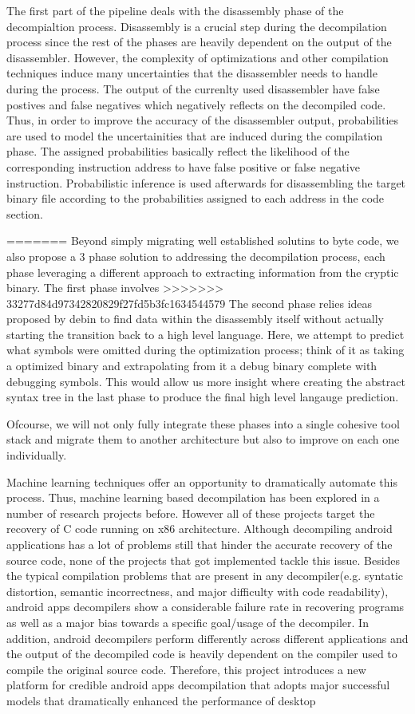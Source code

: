 \documentclass{article}
\begin{document}
The first part of the pipeline deals with the disassembly phase of the decompialtion process. Disassembly is a crucial step during the decompilation process since the rest of the phases are heavily dependent on the output of the disassembler. However, the complexity of optimizations and other compilation techniques induce many uncertainties that the disassembler needs to handle during the process. The output of the currenlty used disassembler have false postives and false negatives which negatively reflects on the decompiled code. Thus, in order to improve the accuracy of the disassembler output, probabilities are used to model the uncertainities that are induced during the compilation phase. The assigned probabilities basically reflect the likelihood of the corresponding instruction address to have false positive or false negative instruction. Probabilistic inference is used afterwards for disassembling the target binary file according to the probabilities assigned to each address in the code section. 


=======
\noindent Beyond simply migrating well established solutins to byte code, we also propose a 3 phase solution to addressing the decompilation process, each phase leveraging a different approach to extracting information from the cryptic binary.
The first phase involves
>>>>>>> 33277d84d97342820829f27fd5b3fc1634544579
The second phase relies ideas proposed by debin to find data within the disassembly itself without actually starting the transition back to a high level language.
Here, we attempt to predict what symbols were omitted during the optimization process; think of it as taking a optimized binary and extrapolating from it a debug binary complete with debugging symbols.
This would allow us more insight where creating the abstract syntax tree in the last phase to produce the final high level langauge prediction.

\noindent Ofcourse, we will not only fully integrate these phases into a single cohesive tool stack and migrate them to another architecture but also to improve on each one individually.

\noindent Machine learning techniques offer an opportunity to dramatically automate this process. Thus, machine learning based decompilation has been explored in a number of research projects before. 
However all of these projects target the recovery of C code running on x86 architecture. Although decompiling android applications has a lot of problems still that hinder the accurate recovery of the source code, none of the projects that got implemented tackle this issue.
Besides the typical compilation problems that are present in any decompiler(e.g. syntatic distortion, semantic incorrectness, and major difficulty with code readability), android apps decompilers show a considerable failure rate in recovering programs as well as a major bias towards a specific goal/usage of the decompiler. In addition, android decompilers perform differently across different applications and the output of the decompiled code is heavily dependent on the compiler used to compile the original source code.
Therefore, this project introduces a new platform for credible android apps decompilation that adopts major successful models that dramatically enhanced the performance of desktop  
\end{document}
